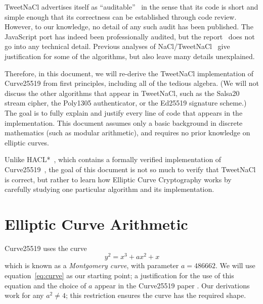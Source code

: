 \documentclass{article}
\begin{document}
TweetNaCl advertises itself as ``auditable''~\cite{Bernstein:2014ca} in the sense that its code is short and simple enough that its correctness can be established through code review.
However, to our knowledge, no detail of any such audit has been published.
The JavaScript port has indeed been professionally audited, but the report~\cite{TweetNaClAudit} does not go into any technical detail.
Previous analyses of NaCl/TweetNaCl~\cite{Bernstein:2009,Janssen:2014} give justification for some of the algorithms, but also leave many details unexplained.

Therefore, in this document, we will re-derive the TweetNaCl implementation of Curve25519 from first principles, including all of the tedious algebra.
(We will not discuss the other algorithms that appear in TweetNaCl, such as the Salsa20 stream cipher, the Poly1305 authenticator, or the Ed25519 signature scheme.)
The goal is to fully explain and justify every line of code that appears in the implementation.
This document assumes only a basic background in discrete mathematics (such as modular arithmetic), and requires no prior knowledge on elliptic curves.

Unlike HACL*~\cite{HACLStar}, which contains a formally verified implementation of Curve25519~\cite{Zinzindohoue:2017fc}, the goal of this document is not so much to verify that TweetNaCl is correct, but rather to learn how Elliptic Curve Cryptography works by carefully studying one particular algorithm and its implementation.

\section{Elliptic Curve Arithmetic}\label{sec:curve-arithmetic}

Curve25519 uses the curve
\begin{equation}\label{eq:curve}
y^2 = x^3 + a x^2 + x
\end{equation}
which is known as a \emph{Montgomery curve}, with parameter $a = 486662$.
We will use equation~\eqref{eq:curve} as our starting point; a justification for the use of this equation and the choice of $a$ appear in the Curve25519 paper \cite{Bernstein:2006kw}.
Our derivations work for any $a^2 \ne 4$; this restriction ensures the curve has the required shape.
\end{document}
